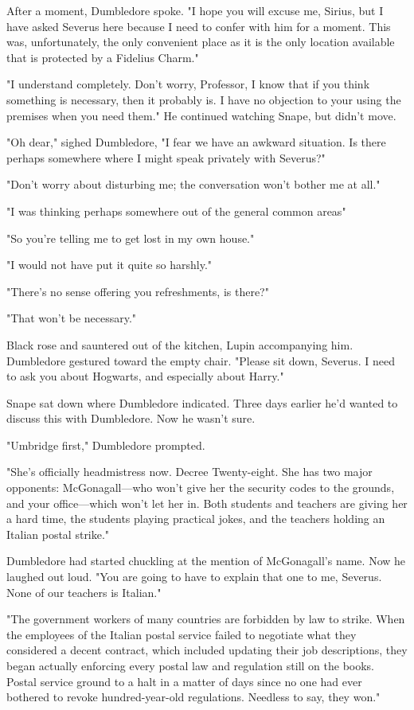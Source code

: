 After a moment, Dumbledore spoke. "I hope you will excuse me, Sirius, but I have asked Severus here because I need to confer with him for a moment. This was, unfortunately, the only convenient place as it is the only location available that is protected by a Fidelius Charm."

"I understand completely. Don't worry, Professor, I know that if you think something is necessary, then it probably is. I have no objection to your using the premises when you need them." He continued watching Snape, but didn't move.

"Oh dear," sighed Dumbledore, "I fear we have an awkward situation. Is there perhaps somewhere where I might speak privately with Severus?"

"Don't worry about disturbing me; the conversation won't bother me at all."

"I was thinking perhaps somewhere out of the general common areas{\el}"

"So you're telling me to get lost in my own house."

"I would not have put it quite so harshly."

"There's no sense offering you refreshments, is there?"

"That won't be necessary."

Black rose and sauntered out of the kitchen, Lupin accompanying him. Dumbledore gestured toward the empty chair. "Please sit down, Severus. I need to ask you about Hogwarts, and especially about Harry."

Snape sat down where Dumbledore indicated. Three days earlier he'd wanted to discuss this with Dumbledore. Now he wasn't sure.

"Umbridge first," Dumbledore prompted.

"She's officially headmistress now. Decree Twenty-eight. She has two major opponents: McGonagall—who won't give her the security codes to the grounds, and your office—which won't let her in. Both students and teachers are giving her a hard time, the students playing practical jokes, and the teachers holding an Italian postal strike."

Dumbledore had started chuckling at the mention of McGonagall's name. Now he laughed out loud. "You are going to have to explain that one to me, Severus. None of our teachers is Italian."

"The government workers of many countries are forbidden by law to strike. When the employees of the Italian postal service failed to negotiate what they considered a decent contract, which included updating their job descriptions, they began actually enforcing every postal law and regulation still on the books. Postal service ground to a halt in a matter of days since no one had ever bothered to revoke hundred-year-old regulations. Needless to say, they won."


